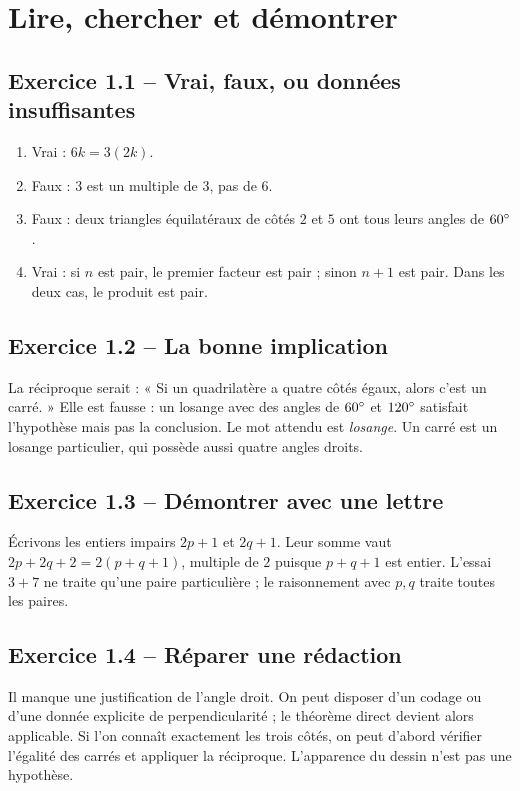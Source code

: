 \chapter{Lire, chercher et démontrer}
\label{corriges:01}
\section*{Exercice 1.1 -- Vrai, faux, ou données insuffisantes}
\begin{enumerate}\item Vrai : $6k=3(2k)$.
\item Faux : $3$ est un multiple de $3$, pas de $6$.
\item Faux : deux triangles équilatéraux de côtés $2$ et $5$ ont tous leurs angles de $60^{\circ}$.
\item Vrai : si $n$ est pair, le premier facteur est pair ; sinon $n+1$ est pair. Dans les deux cas, le produit est pair.\end{enumerate}

\section*{Exercice 1.2 -- La bonne implication}
La réciproque serait : « Si un quadrilatère a quatre côtés égaux, alors c'est un carré. » Elle est fausse : un losange avec des angles de $60^{\circ}$ et $120^{\circ}$ satisfait l'hypothèse mais pas la conclusion. Le mot attendu est \emph{losange}. Un carré est un losange particulier, qui possède aussi quatre angles droits.

\section*{Exercice 1.3 -- Démontrer avec une lettre}
Écrivons les entiers impairs $2p+1$ et $2q+1$. Leur somme vaut $2p+2q+2=2(p+q+1)$, multiple de $2$ puisque $p+q+1$ est entier. L'essai $3+7$ ne traite qu'une paire particulière ; le raisonnement avec $p,q$ traite toutes les paires.

\section*{Exercice 1.4 -- Réparer une rédaction}
Il manque une justification de l'angle droit. On peut disposer d'un codage ou d'une donnée explicite de perpendicularité ; le théorème direct devient alors applicable. Si l'on connaît exactement les trois côtés, on peut d'abord vérifier l'égalité des carrés et appliquer la réciproque. L'apparence du dessin n'est pas une hypothèse.
